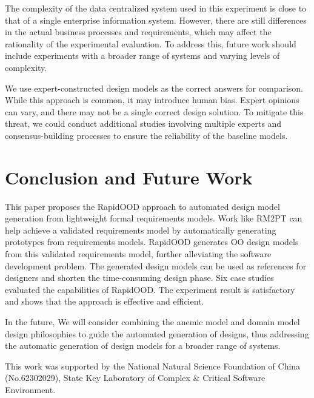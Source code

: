 \documentclass[pdflatex,sn-mathphys-num]{sn-jnl}%
\theoremstyle{thmstyleone}%
\theoremstyle{thmstyletwo}%
\theoremstyle{thmstylethree}%
\begin{document}
The complexity of the data centralized system used in this experiment is close to that of a single enterprise information system. However, there are still differences in the actual business processes and requirements, which may affect the rationality of the experimental evaluation. To address this, future work should include experiments with a broader range of systems and varying levels of complexity.

We use expert-constructed design models as the correct answers for comparison. While this approach is common, it may introduce human bias. Expert opinions can vary, and there may not be a single correct design solution. To mitigate this threat, we could conduct additional studies involving multiple experts and consensus-building processes to ensure the reliability of the baseline models.


\section{Conclusion and Future Work}
This paper proposes the RapidOOD approach to automated design model generation from lightweight formal requirements models. Work like RM2PT can help achieve a validated requirements model by automatically generating prototypes from requirements models. RapidOOD generates OO design models from this validated requirements model, further alleviating the software development problem. The generated design models can be used as references for designers and shorten the time-consuming design phase. Six case studies evaluated the capabilities of RapidOOD. The experiment result is satisfactory and shows that the approach is effective and efficient.

In the future, We will consider combining the anemic model and domain model design philosophies to guide the automated generation of designs, thus addressing the automatic generation of design models for a broader range of systems.  


This work was supported by the National Natural Science Foundation of China (No.62302029), State Key Laboratory of Complex \& Critical Software Environment.



\end{document}
